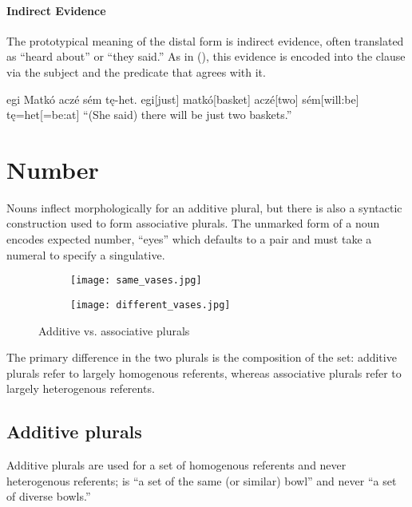 \paragraph{Indirect Evidence}
The prototypical meaning of the distal form is indirect evidence, often translated as “heard about” or “they said.” As in (\nextx), this evidence is encoded into the clause via the subject and the predicate that agrees with it.

\begin{gloss*}
\begingl
\glpreamble egi Matkó aczé sém tę-het.\endpreamble
egi[just]
matkó[basket\gbs{}]
aczé[two\gbs{}]
sém[will:be\gbs{}]
tę=het[=be:at]
\glft “(She said) there will be just two baskets.”
\endgl
\end{gloss*}

\section{Number}
Nouns inflect morphologically for an additive plural, but there is also a syntactic construction used to form associative plurals. The unmarked form of a noun encodes expected number, \eg {} “eyes” which defaults to a pair and must take a numeral to specify a singulative. 

\begin{figure}[h]
    \centering
    \begin{subfigure}{0.4\textwidth}
        \centering
        \texttt{[image: same\_vases.jpg]}
        \caption{}
    \end{subfigure}
    \begin{subfigure}{0.4\textwidth}
        \centering
        \texttt{[image: different\_vases.jpg]}
        \caption{}
    \end{subfigure}
    \caption{Additive vs. associative plurals}
\end{figure}

The primary difference in the two plurals is the composition of the set: additive plurals refer to largely homogenous referents, whereas associative plurals refer to largely heterogenous referents.

\subsection{Additive plurals}
Additive plurals are used for a set of homogenous referents and never heterogenous referents; \eg {} is “a set of the same (or similar) bowl” and never “a set of diverse bowls.”

